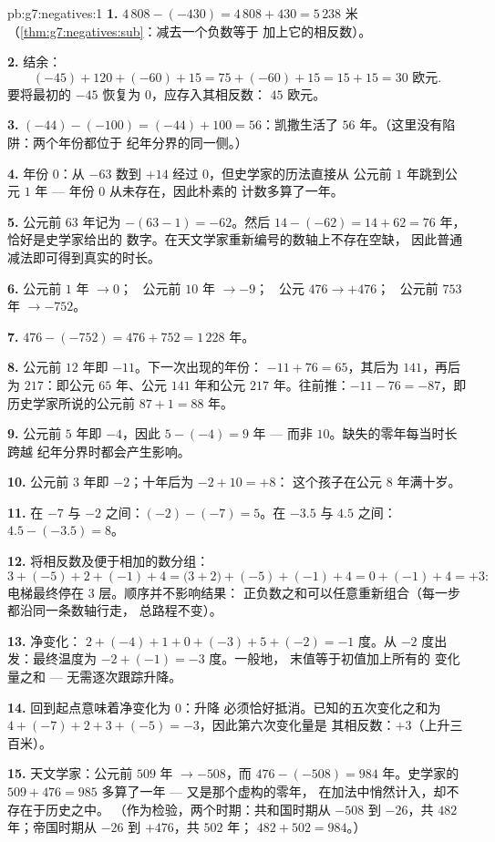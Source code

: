 \begin{solution}{pb:g7:negatives:1}
\textbf{1.} $4\,808 - (-430) = 4\,808 + 430 = 5\,238$ 米
（\cref{thm:g7:negatives:sub}：减去一个负数等于
加上它的相反数）。

\textbf{2.} 结余：
\[
(-45) + 120 + (-60) + 15 = 75 + (-60) + 15 = 15 + 15 = 30
\text{ 欧元}.
\]
要将最初的 $-45$ 恢复为 $0$，应存入其相反数：
$45$ 欧元。

\textbf{3.} $(-44) - (-100) = (-44) + 100 = 56$：凯撒生活了
$56$ 年。（这里没有陷阱：两个年份都位于
纪年分界的同一侧。）

\textbf{4.} 年份 $0$：从 $-63$ 数到 $+14$ 经过
$0$，但史学家的历法直接从
公元前 $1$ 年跳到公元 $1$ 年 --- 年份 $0$ 从未存在，因此朴素的
计数多算了一年。

\textbf{5.} 公元前 $63$ 年记为 $-(63 - 1) = -62$。然后
$14 - (-62) = 14 + 62 = 76$ 年，恰好是史学家给出的
数字。在天文学家重新编号的数轴上不存在空缺，
因此普通减法即可得到真实的时长。

\textbf{6.} 公元前 $1$ 年 $\to 0$； \ 公元前 $10$ 年 $\to -9$； \ 公元
$476 \to +476$； \ 公元前 $753$ 年 $\to -752$。

\textbf{7.} $476 - (-752) = 476 + 752 = 1\,228$ 年。

\textbf{8.} 公元前 $12$ 年即 $-11$。下一次出现的年份：
$-11 + 76 = 65$，其后为 $141$，再后为 $217$：即公元 $65$ 年、公元
$141$ 年和公元 $217$ 年。往前推：$-11 - 76 = -87$，即
历史学家所说的公元前 $87 + 1 = 88$ 年。

\textbf{9.} 公元前 $5$ 年即 $-4$，因此 $5 - (-4) = 9$ 年 --- 而非
$10$。缺失的零年每当时长跨越
纪年分界时都会产生影响。

\textbf{10.} 公元前 $3$ 年即 $-2$；十年后为 $-2 + 10 = +8$：
这个孩子在公元 $8$ 年满十岁。

\textbf{11.} 在 $-7$ 与 $-2$ 之间：$(-2) - (-7) = 5$。在
$-3.5$ 与 $4.5$ 之间：$4.5 - (-3.5) = 8$。

\textbf{12.} 将相反数及便于相加的数分组：
\[
3 + (-5) + 2 + (-1) + 4
= \bigl(3 + 2\bigr) + (-5) + (-1) + 4
= 0 + (-1) + 4 = +3 :
\]
电梯最终停在 $3$ 层。顺序并不影响结果：
正负数之和可以任意重新组合（每一步都沿同一条数轴行走，
总路程不变）。

\textbf{13.} 净变化：
$2 + (-4) + 1 + 0 + (-3) + 5 + (-2) = -1$ 度。从
$-2$ 度出发：最终温度为 $-2 + (-1) = -3$ 度。一般地，
末值等于初值加上所有的
变化量之和 --- 无需逐次跟踪升降。

\textbf{14.} 回到起点意味着净变化为 $0$：升降
必须恰好抵消。已知的五次变化之和为
$4 + (-7) + 2 + 3 + (-5) = -3$，因此第六次变化量是
其相反数：$+3$（上升三百米）。

\textbf{15.} 天文学家：公元前 $509$ 年 $\to -508$，而
$476 - (-508) = 984$ 年。史学家的 $509 + 476 = 985$
多算了一年 --- 又是那个虚构的零年，
在加法中悄然计入，却不存在于历史之中。
（作为检验，两个时期：共和国时期从 $-508$ 到 $-26$，共 $482$
年；帝国时期从 $-26$ 到 $+476$，共 $502$ 年；
$482 + 502 = 984$。）
\end{solution}
